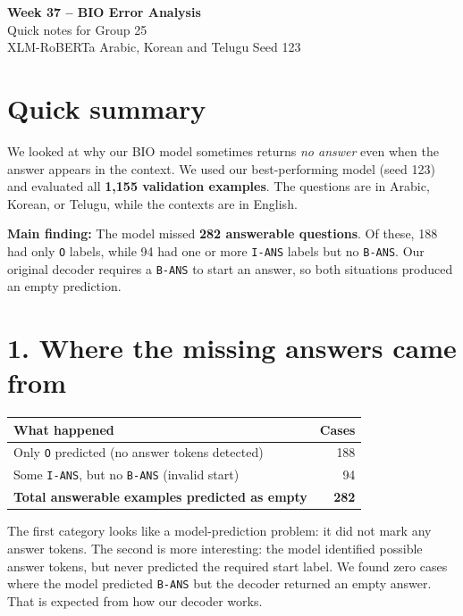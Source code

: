 \documentclass[11pt,a4paper]{article}
\begin{document}
\begin{center}
{\Large\bfseries Week 37 -- BIO Error Analysis}\\[4pt]
{\normalsize Quick notes for Group 25}\\[3pt]
{\small XLM-RoBERTa \textbar{} Arabic, Korean and Telugu \textbar{} Seed 123}
\end{center}

\section*{Quick summary}

We looked at why our BIO model sometimes returns \emph{no answer} even when the answer appears in the context. We used our best-performing model (seed 123) and evaluated all \textbf{1,155 validation examples}. The questions are in Arabic, Korean, or Telugu, while the contexts are in English.

\textbf{Main finding:} The model missed \textbf{282 answerable questions}. Of these, 188 had only \texttt{O} labels, while 94 had one or more \texttt{I-ANS} labels but no \texttt{B-ANS}. Our original decoder requires a \texttt{B-ANS} to start an answer, so both situations produced an empty prediction.

\section*{1. Where the missing answers came from}

\begin{center}
\begin{tabular}{p{11cm}r}
\hline
\textbf{What happened} & \textbf{Cases} \\
\hline
Only \texttt{O} predicted (no answer tokens detected) & 188 \\
Some \texttt{I-ANS}, but no \texttt{B-ANS} (invalid start) & 94 \\
\hline
\textbf{Total answerable examples predicted as empty} & \textbf{282} \\
\hline
\end{tabular}
\end{center}

The first category looks like a model-prediction problem: it did not mark any answer tokens. The second is more interesting: the model identified possible answer tokens, but never predicted the required start label. We found zero cases where the model predicted \texttt{B-ANS} but the decoder returned an empty answer. That is expected from how our decoder works.
\end{document}
